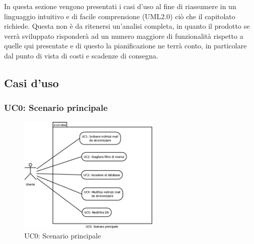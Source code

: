 In questa sezione vengono presentati i casi d\textquoteright{}uso al fine di riassumere in un linguaggio intuitivo e di facile comprensione (UML2.0) ci\`{o} che il capitolato richiede. Questa non \`{e} da ritenersi un\textquoteright{}analisi completa, in quanto il prodotto se verr\`{a} sviluppato risponder\`{a} ad un numero maggiore di funzionalit\`{a} rispetto a quelle qui presentate e di questo la pianificazione ne terr\`{a} conto, in particolare dal punto di vista di costi e scadenze di consegna.

\subsection{Casi d'uso}

\subsubsection[UC0: Scenario principale]{UC0: Scenario principale}
\begin{figure}[H]
\begin{center}
\includegraphics[width=0.60\textwidth]{img/UC0_ScenarioPrincipale.png}
\caption{UC0: Scenario principale}
\label{fig:UC0}
\end{center}
\end{figure}

